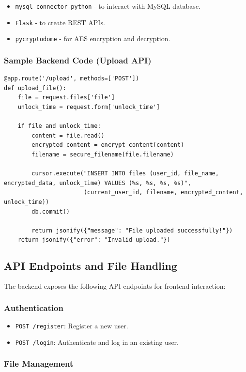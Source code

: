 \documentclass[12pt]{article}
\begin{document}
\begin{itemize}
    \item \texttt{mysql-connector-python} - to interact with MySQL database.
    \item \texttt{Flask} - to create REST APIs.
    \item \texttt{pycryptodome} - for AES encryption and decryption.
\end{itemize}

\subsubsection{Sample Backend Code (Upload API)}

\begin{verbatim}
@app.route('/upload', methods=['POST'])
def upload_file():
    file = request.files['file']
    unlock_time = request.form['unlock_time']

    if file and unlock_time:
        content = file.read()
        encrypted_content = encrypt_content(content)
        filename = secure_filename(file.filename)

        cursor.execute("INSERT INTO files (user_id, file_name, encrypted_data, unlock_time) VALUES (%s, %s, %s, %s)",
                       (current_user_id, filename, encrypted_content, unlock_time))
        db.commit()

        return jsonify({"message": "File uploaded successfully!"})
    return jsonify({"error": "Invalid upload."})
\end{verbatim}

\subsection{API Endpoints and File Handling}

The backend exposes the following API endpoints for frontend interaction:

\subsubsection{Authentication}

\begin{itemize}
    \item \texttt{POST /register}: Register a new user.
    \item \texttt{POST /login}: Authenticate and log in an existing user.
\end{itemize}

\subsubsection{File Management}
\end{document}
